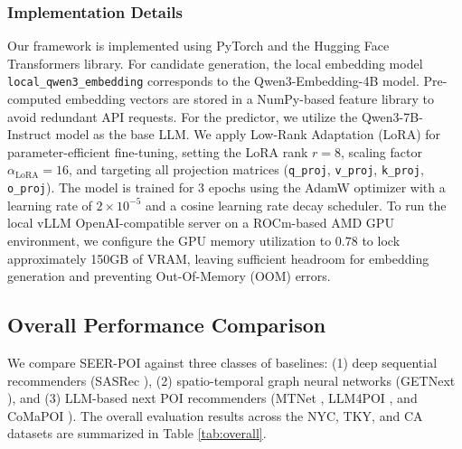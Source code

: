 \documentclass[10pt,twocolumn]{article}
\newcommand{\method}{SEER-POI}
\newcommand{\code}[1]{\texttt{#1}}
\begin{document}
\subsubsection{Implementation Details}
Our framework is implemented using PyTorch and the Hugging Face Transformers library. For candidate generation, the local embedding model \code{local\_qwen3\_embedding} corresponds to the Qwen3-Embedding-4B model. Pre-computed embedding vectors are stored in a NumPy-based feature library to avoid redundant API requests. For the predictor, we utilize the Qwen3-7B-Instruct model as the base LLM. We apply Low-Rank Adaptation (LoRA) for parameter-efficient fine-tuning, setting the LoRA rank $r = 8$, scaling factor $\alpha_{\mathrm{LoRA}} = 16$, and targeting all projection matrices (\code{q\_proj}, \code{v\_proj}, \code{k\_proj}, \code{o\_proj}). The model is trained for 3 epochs using the AdamW optimizer with a learning rate of $2 \times 10^{-5}$ and a cosine learning rate decay scheduler. To run the local vLLM OpenAI-compatible server on a ROCm-based AMD GPU environment, we configure the GPU memory utilization to $0.78$ to lock approximately 150GB of VRAM, leaving sufficient headroom for embedding generation and preventing Out-Of-Memory (OOM) errors.

\subsection{Overall Performance Comparison}
We compare \method{} against three classes of baselines: (1) deep sequential recommenders (SASRec \cite{sasrec}), (2) spatio-temporal graph neural networks (GETNext \cite{getnext}), and (3) LLM-based next POI recommenders (MTNet \cite{mtnet}, LLM4POI \cite{llm4poi}, and CoMaPOI \cite{comapoi}). The overall evaluation results across the NYC, TKY, and CA datasets are summarized in Table \ref{tab:overall}.
\end{document}
